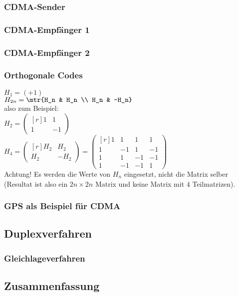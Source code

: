 \subsubsection*{CDMA-Sender}
\subsubsection*{CDMA-Empfänger 1}
\subsubsection*{CDMA-Empfänger 2}

\subsubsection*{Orthogonale Codes}
$H_1=(+1)$\\
$H_{2n}=\mtr{H_n & H_n \\ H_n & -H_n}$\\
also zum Beispiel:\\
$H_2=\begin{pmatrix*}[r]
1 & 1 \\ 1 & -1
\end{pmatrix*}
$\\
$H_4=\begin{pmatrix*}[r]H_2 & H_2 \\ H_2 & -H_2\end{pmatrix*}=\begin{pmatrix*}[r]1 & 1 & 1 & 1\\ 1 & -1 & 1 & -1 \\ 1 & 1 & -1 & -1 \\ 1 & -1 & -1 & 1\end{pmatrix*}$\\
Achtung! Es werden die Werte von $H_n$ eingesetzt, nicht die Matrix selber (Resultat ist also ein $2n \times 2n$ Matrix und keine Matrix mit $4$ Teilmatrizen).

\subsubsection*{GPS als Beispiel für CDMA}

\subsection{Duplexverfahren}
\subsubsection{Gleichlageverfahren}

\subsection{Zusammenfassung}

